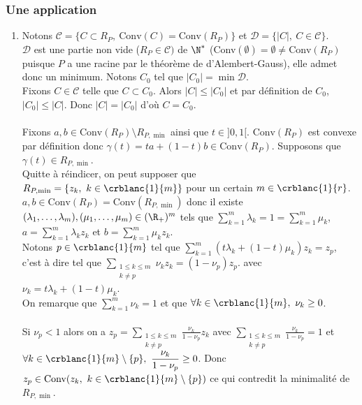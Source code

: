 \documentclass{book}
\begin{document}
	\subsubsection{Une application }
	\begin{enumerate}
		\item Notons $\mathcal{C}=\{C\subset R_P,\ \text{Conv}(C)=\text{Conv}(R_P)\}$ et $\mathcal{D}=\{|C|,\ C\in \mathcal{C}\}$.\\
		$\mathcal{D}$ est une partie non vide ($R_P\in \mathcal{C})$ de $\N^*$ (Conv$(\emptyset)=\emptyset\ne \text{Conv}(R_P)$ puisque $P$ a une racine par le théorème de d'Alembert-Gauss), elle admet donc un minimum. Notons $C_0$ tel que $|C_0|=\min\mathcal{D}$.\\
		Fixons $C\in \mathcal{C}$ telle que $C\subset C_0$. Alors $|C|\leq |C_0|$ et par définition de $C_0$, $|C_0|\leq |C|$. Donc $|C|=|C_0|$ d'où $C=C_0$.\\\\
		Fixons $a,b\in \text{Conv}(R_P)\setminus R_{P,\min}$ ainsi que $t\in ]0,1[$. $\text{Conv}(R_P)$ est convexe par définition donc $\gamma(t)=ta+(1-t)b\in \text{Conv}(R_P)$. Supposons que $\gamma(t)\in R_{P,\min}$.\\
		Quitte à réindicer, on peut supposer que $R_{P,\min}=\{z_k,\ k\in \crblanc{1}{m}\}$ pour un certain $m\in \crblanc{1}{r}$. $a,b\in \text{Conv}(R_P)=\text{Conv}(R_{P,\min})$ donc il existe $(\lambda_1,\dots,\lambda_m),(\mu_1,\dots,\mu_m)\in (\R_+)^m$ tels que $\displaystyle\sum\limits_{k=1}^m\lambda_k=1=\sum\limits_{k=1}^m\mu_k$, $a=\displaystyle\sum\limits_{k=1}^m\lambda_k z_k$ et $b=\displaystyle\sum\limits_{k=1}^m\mu_k z_k$.\\
		Notons $p\in \crblanc{1}{m}$ tel que $\displaystyle\sum\limits_{k=1}^m(t\lambda_k+(1-t)\mu_k)z_k=z_p$, c'est à dire tel que $\displaystyle\sum\limits_{\substack{1\leq k\leq m\\k\ne p}}\nu_k z_k=(1-\nu_p)z_p$. avec $\nu_k=t\lambda_k+(1-t)\mu_k$.\\
		On remarque que $\displaystyle\sum\limits_{k=1}^m\nu_k=1$ et que $\forall k\in \crblanc{1}{m},\ \nu_k\geq 0$.\\\\
		Si $\nu_p<1$ alors on a $z_p=\displaystyle\sum\limits_{\substack{1\leq k\leq m\\k\ne p}}\frac{\nu_k}{1-\nu_p}z_k$ avec $\displaystyle\sum\limits_{\substack{1\leq k\leq m\\k\ne p}}\frac{\nu_k}{1-\nu_p}=1$ et $\forall k\in \crblanc{1}{m}\setminus\{p\},\ \displaystyle\frac{\nu_k}{1-\nu_p}\geq 0$. Donc $z_p\in \text{Conv}(z_k,\ k\in \crblanc{1}{m}\setminus\{p\})$ ce qui contredit la minimalité de $R_{P,\min}$.\\

\end{enumerate}
\end{document}
